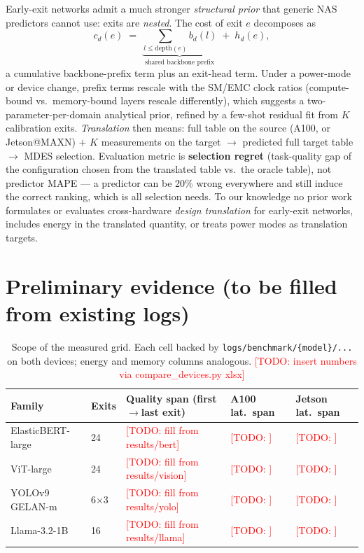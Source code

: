 \documentclass[11pt]{article}
\newcommand{\todo}[1]{\textcolor{red}{[TODO: #1]}}
\newcommand{\mdes}{MDES}
\begin{document}
Early-exit networks admit a much stronger \emph{structural prior} that generic
NAS predictors cannot use: exits are \emph{nested}. The cost of exit $e$
decomposes as
\[ c_d(e) \;=\; \underbrace{\textstyle\sum_{l \le \mathrm{depth}(e)} b_d(l)}_{\text{shared backbone prefix}} \;+\; h_d(e), \]
a cumulative backbone-prefix term plus an exit-head term. Under a power-mode
or device change, prefix terms rescale with the SM/EMC clock ratios
(compute-bound vs.\ memory-bound layers rescale differently), which suggests a
two-parameter-per-domain analytical prior, refined by a few-shot residual fit
from $K$ calibration exits. \emph{Translation} then means: full table on the
source (A100, or Jetson@MAXN) $+$ $K$ measurements on the target
$\rightarrow$ predicted full target table $\rightarrow$ \mdes{} selection.
Evaluation metric is \textbf{selection regret} (task-quality gap of the
configuration chosen from the translated table vs.\ the oracle table), not
predictor MAPE --- a predictor can be 20\% wrong everywhere and still induce
the correct ranking, which is all selection needs. To our knowledge no prior
work formulates or evaluates cross-hardware \emph{design translation} for
early-exit networks, includes energy in the translated quantity, or treats
power modes as translation targets.

\section{Preliminary evidence (to be filled from existing logs)}

\begin{table}[h]
\centering\small
\begin{tabular}{lllll}
\toprule
Family & Exits & Quality span (first$\to$last exit) & A100 lat.\ span & Jetson lat.\ span\\
\midrule
ElasticBERT-large & 24 & \todo{fill from results/bert} & \todo{} & \todo{}\\
ViT-large & 24 & \todo{fill from results/vision} & \todo{} & \todo{}\\
YOLOv9 GELAN-m & 6$\times$3 & \todo{fill from results/yolo} & \todo{} & \todo{}\\
Llama-3.2-1B & 16 & \todo{fill from results/llama} & \todo{} & \todo{}\\
\bottomrule
\end{tabular}
\caption{Scope of the measured grid. Each cell backed by
\texttt{logs/benchmark/\{model\}/...} on both devices; energy and memory
columns analogous. \todo{insert numbers via compare\_devices.py xlsx}}
\end{table}
\end{document}
